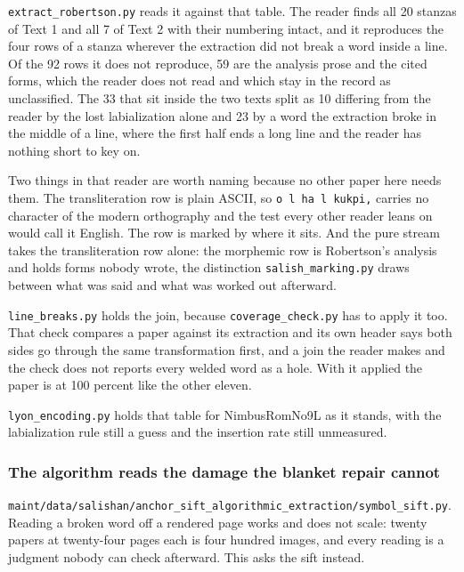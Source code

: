 \texttt{extract\_\allowbreak{}robertson.\allowbreak{}py} reads it against that table. The reader finds all 20 stanzas of Text 1 and all 7 of Text 2 with their numbering intact, and it reproduces the four rows of a stanza wherever the extraction did not break a word inside a line. Of the 92 rows it does not reproduce, 59 are the analysis prose and the cited forms, which the reader does not read and which stay in the record as unclassified. The 33 that sit inside the two texts split as 10 differing from the reader by the lost labialization alone and 23 by a word the extraction broke in the middle of a line, where the first half ends a long line and the reader has nothing short to key on.

Two things in that reader are worth naming because no other paper here needs them. The transliteration row is plain ASCII, so \texttt{o l ha l kukpi,} carries no character of the modern orthography and the test every other reader leans on would call it English. The row is marked by where it sits. And the pure stream takes the transliteration row alone: the morphemic row is Robertson's analysis and holds forms nobody wrote, the distinction \texttt{salish\_\allowbreak{}marking.\allowbreak{}py} draws between what was said and what was worked out afterward.

\texttt{line\_\allowbreak{}breaks.\allowbreak{}py} holds the join, because \texttt{coverage\_\allowbreak{}check.\allowbreak{}py} has to apply it too. That check compares a paper against its extraction and its own header says both sides go through the same transformation first, and a join the reader makes and the check does not reports every welded word as a hole. With it applied the paper is at 100 percent like the other eleven.

\texttt{lyon\_\allowbreak{}encoding.\allowbreak{}py} holds that table for NimbusRomNo9L as it stands, with the labialization rule still a guess and the insertion rate still unmeasured.

\subsubsection{The algorithm reads the damage the blanket repair cannot}

\texttt{maint/\allowbreak{}data/\allowbreak{}salishan/\allowbreak{}anchor\_\allowbreak{}sift\_\allowbreak{}algorithmic\_\allowbreak{}extraction/\allowbreak{}symbol\_\allowbreak{}sift.\allowbreak{}py}. Reading a broken word off a rendered page works and does not scale: twenty papers at twenty-four pages each is four hundred images, and every reading is a judgment nobody can check afterward. This asks the sift instead.

